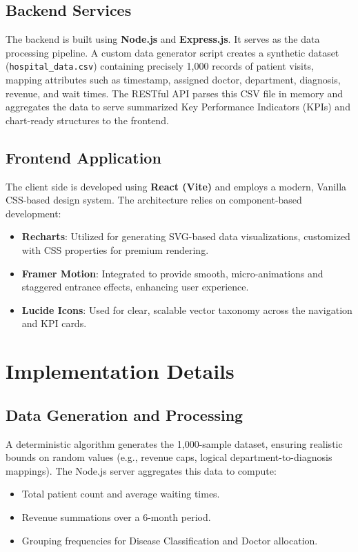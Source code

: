 \documentclass[12pt,a4paper]{report}
\begin{document}
\section{Backend Services}
The backend is built using \textbf{Node.js} and \textbf{Express.js}. It serves as the data processing pipeline. A custom data generator script creates a synthetic dataset (\texttt{hospital\_data.csv}) containing precisely 1,000 records of patient visits, mapping attributes such as timestamp, assigned doctor, department, diagnosis, revenue, and wait times. The RESTful API parses this CSV file in memory and aggregates the data to serve summarized Key Performance Indicators (KPIs) and chart-ready structures to the frontend.

\section{Frontend Application}
The client side is developed using \textbf{React (Vite)} and employs a modern, Vanilla CSS-based design system. The architecture relies on component-based development:
\begin{itemize}
    \item \textbf{Recharts}: Utilized for generating SVG-based data visualizations, customized with CSS properties for premium rendering.
    \item \textbf{Framer Motion}: Integrated to provide smooth, micro-animations and staggered entrance effects, enhancing user experience.
    \item \textbf{Lucide Icons}: Used for clear, scalable vector taxonomy across the navigation and KPI cards.
\end{itemize}

\chapter{Implementation Details}

\section{Data Generation and Processing}
A deterministic algorithm generates the 1,000-sample dataset, ensuring realistic bounds on random values (e.g., revenue caps, logical department-to-diagnosis mappings). The Node.js server aggregates this data to compute:
\begin{itemize}
    \item Total patient count and average waiting times.
    \item Revenue summations over a 6-month period.
    \item Grouping frequencies for Disease Classification and Doctor allocation.
\end{itemize}
\end{document}
